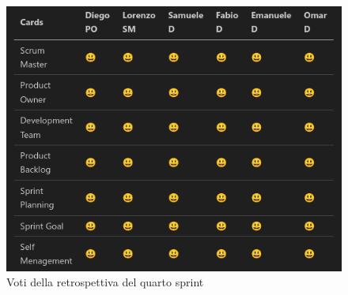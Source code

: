 \documentclass{article}
\begin{document}
\begin{figure}[H]
    \centering
    \includegraphics[width=1\textwidth]{retrospettiva4}
    \caption{Voti della retrospettiva del quarto sprint}
    \label{fig:retrospettiva4}
\end{figure}
\end{document}
